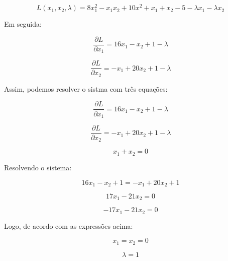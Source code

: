 \documentclass[11pt]{article}
\begin{document}
\[L(x_1,x_2,\lambda) = 8x_1^2 - x_1x_2 + 10x^2 + x_1 + x_2 - 5 - \lambda x_1 - \lambda x_2 \]

Em seguida:

\[ \frac{\partial L}{\partial x_1} = 16x_1 - x_2 + 1 - \lambda\]

\[ \frac{\partial L}{\partial x_2} = -x_1 + 20x_2 + 1 - \lambda\]

Assim, podemos resolver o sistma com três equações:

\[ \frac{\partial L}{\partial x_1} = 16x_1 - x_2 + 1 - \lambda\]

\[ \frac{\partial L}{\partial x_2} = -x_1 + 20x_2 + 1 - \lambda\]

\[ x_1 + x_2 = 0\]

Resolvendo o sistema:

\[ 16x_1 - x_2 + 1 = -x_1 + 20x_2 + 1 \]

\[ 17x_1 - 21x_2 = 0 \]

\[ -17x_1 - 21x_2 = 0 \]

Logo, de acordo com as expressões acima:

\[ x_1 = x_2 = 0 \]

\[\lambda = 1 \]


    
    
    
    
\end{document}
